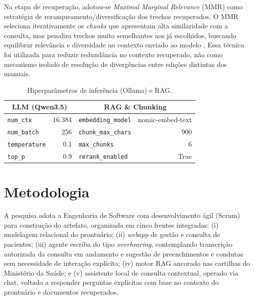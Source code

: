 \documentclass[12pt]{article}
\begin{document}
Na etapa de recuperação, adotou-se \textit{Maximal Marginal Relevance} (MMR) como estratégia de reranqueamento/diversificação dos trechos recuperados.
O MMR seleciona iterativamente os \textit{chunks} que apresentam alta similaridade com a consulta, mas penaliza trechos muito semelhantes aos já escolhidos, buscando equilibrar relevância e diversidade no contexto enviado ao modelo \cite{CarbonellGoldstein1998MMR}.
Essa técnica foi utilizada para reduzir redundância no contexto recuperado, não como mecanismo isolado de resolução de divergências entre edições distintas dos manuais.

\begin{table}[H]
  \centering
  \caption{Hiperparâmetros de inferência (Ollama) e RAG.}
  \label{tab:hyperparams}
  \small
  \begin{tabular}{l r | l r}
    \toprule
    \multicolumn{2}{c}{\textbf{LLM (Qwen3.5)}} & \multicolumn{2}{c}{\textbf{RAG \& Chunking}} \\
    \midrule
    \texttt{num\_ctx}                          & 16.384 & \texttt{embedding\_model}  & nomic-embed-text \\
    \texttt{num\_batch}                        & 256    & \texttt{chunk\_max\_chars} & 900              \\
    \texttt{temperature}                       & 0.1    & \texttt{max\_chunks}       & 6                \\
    \texttt{top\_p}                            & 0.9    & \texttt{rerank\_enabled}   & True             \\
    \bottomrule
  \end{tabular}
\end{table}


\section{Metodologia}

A pesquisa adota a Engenharia de Software com desenvolvimento ágil (Scrum) para construção do artefato, organizada em cinco frentes integradas:
(i) modelagem relacional do prontuário;
(ii) \textit{webapp} de gestão e consulta de pacientes;
(iii) agente escriba do tipo \textit{overhearing}, contemplando transcrição autorizada da consulta em andamento e sugestão de preenchimentos e condutas sem necessidade de interação explícita;
(iv) motor RAG ancorado nas cartilhas do Ministério da Saúde;
e (v) assistente local de consulta contextual, operado via chat, voltado a responder perguntas explícitas com base no contexto do prontuário e documentos recuperados.
\end{document}
